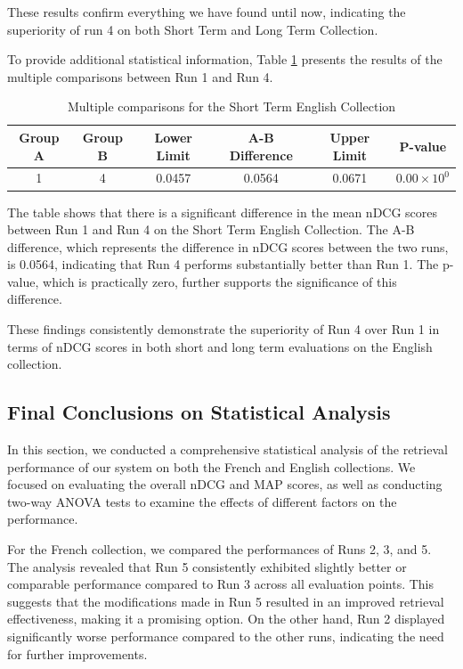 These results confirm everything we have found until now, indicating the superiority of run 4 on both Short Term and Long Term Collection.

To provide additional statistical information, Table \ref{table:st_anova_eng} presents the results of the multiple comparisons between Run 1 and Run 4.

\begin{table}[!h]
\centering
\caption{Multiple comparisons for the Short Term English Collection}
\label{table:st_anova_eng}
\begin{tabular}{cccccc}
\hline
Group A & Group B & Lower Limit & A-B Difference & Upper Limit & P-value \\
\hline
1 & 4 & 0.0457 & 0.0564 & 0.0671 & $0.00 \times 10^{0}$ \\
\hline
\end{tabular}
\end{table}

The table shows that there is a significant difference in the mean \ac{nDCG} scores between Run 1 and Run 4 on the Short Term English Collection. 
The A-B difference, which represents the difference in \ac{nDCG} scores between the two runs, is 0.0564, indicating that Run 4 performs substantially better than Run 1. 
The p-value, which is practically zero, further supports the significance of this difference.

These findings consistently demonstrate the superiority of Run 4 over Run 1 in terms of \ac{nDCG} scores in both short and long term evaluations on the English collection.

\subsection{Final Conclusions on Statistical Analysis}

In this section, we conducted a comprehensive statistical analysis of the retrieval performance of our system on both the French and English collections. 
We focused on evaluating the overall \ac{nDCG} and \ac{MAP} scores, as well as conducting two-way \ac{ANOVA} tests to examine the effects of different factors on the performance.

For the French collection, we compared the performances of Runs 2, 3, and 5. 
The analysis revealed that Run 5 consistently exhibited slightly better or comparable performance compared to Run 3 across all evaluation points. 
This suggests that the modifications made in Run 5 resulted in an improved retrieval effectiveness, making it a promising option. 
On the other hand, Run 2 displayed significantly worse performance compared to the other runs, indicating the need for further improvements.

